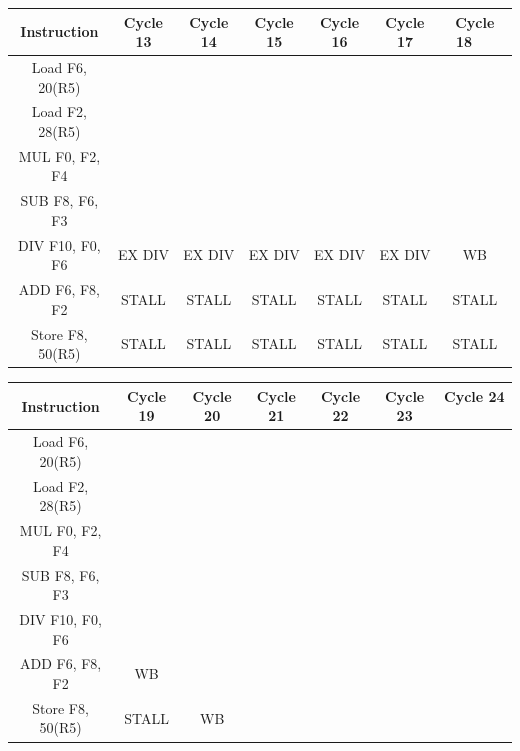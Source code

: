 \documentclass[a4paper, 11pt]{exam}
\begin{document}
\begin{center}
\begin{enumerate}
\begin{enumerate}
\begin{center}
\begin{tabular}{ |c|c|c|c|c|c|c| } 
 \hline
  \textbf{Instruction} & \textbf{Cycle 13} & \textbf{Cycle 14} & \textbf{Cycle 15} & \textbf{Cycle 16} & \textbf{Cycle 17} & 
  \textbf{Cycle 18 \ \ } \\ 
  \hline
 Load F6, 20(R5) &  &  &  &  &  & \\ \hline
 Load F2, 28(R5) &  &  &  &  &  & \\ \hline
 MUL F0, F2, F4 &  &  &  &  &  & \\ \hline
 SUB F8, F6, F3 &  &  &  &  & & \\ \hline
 DIV F10, F0, F6 & EX DIV & EX DIV & EX DIV & EX DIV & EX DIV & WB\\ \hline
 ADD F6, F8, F2 & STALL & STALL & STALL & STALL & STALL & STALL\\ \hline
 Store F8, 50(R5) & STALL & STALL & STALL & STALL & STALL & STALL\\ \hline
\end{tabular}

\begin{tabular}{ |c|c|c|c|c|c|c| } 
 \hline
  \textbf{Instruction} & \textbf{Cycle 19} & \textbf{Cycle 20} & \textbf{Cycle 21} & \textbf{Cycle 22} & \textbf{Cycle 23} & 
  \textbf{Cycle 24 \ \ } \\ 
  \hline
 Load F6, 20(R5) &  &  &  &  &  & \\ \hline
 Load F2, 28(R5) &  &  &  &  &  & \\ \hline
 MUL F0, F2, F4 &  &  &  &  &  & \\ \hline
 SUB F8, F6, F3 &  &  &  &  &  & \\ \hline
 DIV F10, F0, F6 &  &  &  &  &  & \\ \hline
 ADD F6, F8, F2 & WB &  &  &  &  & \\ \hline
 Store F8, 50(R5) & STALL & WB &  &  &  & \\ \hline
\end{tabular}
\end{center}


\end{enumerate}


\end{enumerate}
\end{center}
\end{document}
